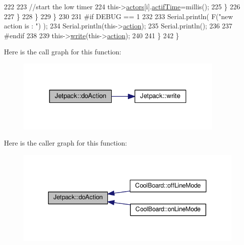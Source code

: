 \begin{DoxyCode}
222 
223                         \textcolor{comment}{//start the low timer}
224                         this->\hyperlink{classJetpack_a7e16d2f97837f9712a2e6de1c50d99db}{actors}[i].\hyperlink{structJetpack_1_1state_af2e1cc323ef9ffcc3cf4d203f85d726b}{actifTime}=millis();              
225                     \}           
226             
227                 \}
228             \}
229         \}
230     
231 \textcolor{preprocessor}{    #if DEBUG == 1 }
232 
233         Serial.println( F(\textcolor{stringliteral}{"new action is : "}) );
234         Serial.println(this->\hyperlink{classJetpack_aca3142925a7b0834b34ae91d26af7765}{action});
235         Serial.println();
236     
237 \textcolor{preprocessor}{    #endif }
238 
239         this->\hyperlink{classJetpack_a338f1af8cbc6504ac69b47c7328569b5}{write}(this->\hyperlink{classJetpack_aca3142925a7b0834b34ae91d26af7765}{action});
240 
241     \} 
242 \}
\end{DoxyCode}
Here is the call graph for this function\+:\nopagebreak
\begin{figure}[H]
\begin{center}
\leavevmode
\includegraphics[width=289pt]{classJetpack_a86d2e83436ef4b85f4c3a6e85ac785b0_cgraph}
\end{center}
\end{figure}
Here is the caller graph for this function\+:\nopagebreak
\begin{figure}[H]
\begin{center}
\leavevmode
\includegraphics[width=333pt]{classJetpack_a86d2e83436ef4b85f4c3a6e85ac785b0_icgraph}
\end{center}
\end{figure}
\mbox{\label{classJetpack_ac54a7bb4f9166bee32052253d9b1d306}} 
